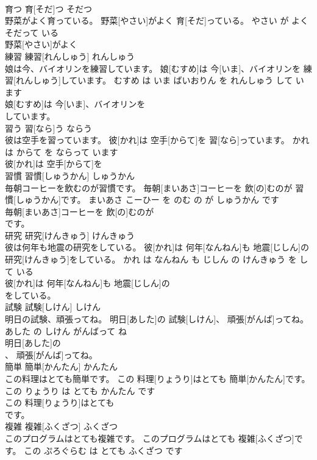 \documentclass[8pt]{extreport}
\begin{document}
\begin{CJK}{UTF8}{min}
\\	育つ	育[そだ]つ	そだつ	
\\	野菜がよく育っている。	野菜[やさい]がよく 育[そだ]っている。	やさい が よく そだって いる	
\\	野菜[やさい]がよく
\\	練習	練習[れんしゅう]	れんしゅう	
\\	娘は今、バイオリンを練習しています。	娘[むすめ]は 今[いま]、バイオリンを 練習[れんしゅう]しています。	むすめ は いま ばいおりん を れんしゅう して います	
\\	娘[むすめ]は 今[いま]、バイオリンを
\\	しています。			
\\	習う	習[なら]う	ならう	
\\	彼は空手を習っています。	彼[かれ]は 空手[からて]を 習[なら]っています。	かれ は からて を ならって います	
\\	彼[かれ]は 空手[からて]を
\\	習慣	習慣[しゅうかん]	しゅうかん	
\\	毎朝コーヒーを飲むのが習慣です。	毎朝[まいあさ]コーヒーを 飲[の]むのが 習慣[しゅうかん]です。	まいあさ こーひー を のむ の が しゅうかん です	
\\	毎朝[まいあさ]コーヒーを 飲[の]むのが
\\	です。			
\\	研究	研究[けんきゅう]	けんきゅう	
\\	彼は何年も地震の研究をしている。	彼[かれ]は 何年[なんねん]も 地震[じしん]の 研究[けんきゅう]をしている。	かれ は なんねん も じしん の けんきゅう を して いる	
\\	彼[かれ]は 何年[なんねん]も 地震[じしん]の
\\	をしている。			
\\	試験	試験[しけん]	しけん	
\\	明日の試験、頑張ってね。	明日[あした]の 試験[しけん]、 頑張[がんば]ってね。	あした の しけん がんばって ね	
\\	明日[あした]の
\\	、 頑張[がんば]ってね。			
\\	簡単	簡単[かんたん]	かんたん	
\\	この料理はとても簡単です。	この 料理[りょうり]はとても 簡単[かんたん]です。	この りょうり は とても かんたん です	
\\	この 料理[りょうり]はとても
\\	です。			
\\	複雑	複雑[ふくざつ]	ふくざつ	
\\	このプログラムはとても複雑です。	このプログラムはとても 複雑[ふくざつ]です。	この ぷろぐらむ は とても ふくざつ です	

\end{CJK}
\end{document}
